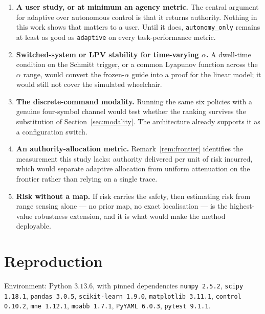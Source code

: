\documentclass[11pt,a4paper]{article}
\newcommand{\vauto}{\texttt{autonomy\_only}}
\newcommand{\vadapt}{\texttt{adaptive}}
\theoremstyle{plain}
\theoremstyle{definition}
\begin{document}
\begin{enumerate}
\item \textbf{A user study, or at minimum an agency metric.} The central
argument for adaptive over autonomous control is that it returns
authority. Nothing in this work shows that matters to a user. Until it
does, \vauto{} remains at least as good as \vadapt{} on every
task-performance metric.

\item \textbf{Switched-system or LPV stability for time-varying
$\alpha$.} A dwell-time condition on the Schmitt trigger, or a common
Lyapunov function across the $\alpha$ range, would convert the
frozen-$\alpha$ guide into a proof for the linear model; it would still
not cover the simulated wheelchair.

\item \textbf{The discrete-command modality.} Running the same six
policies with a genuine four-symbol channel would test whether the
ranking survives the substitution of Section~\ref{sec:modality}. The
architecture already supports it as a configuration switch.

\item \textbf{An authority-allocation metric.} Remark~\ref{rem:frontier}
identifies the measurement this study lacks: authority delivered per unit
of risk incurred, which would separate adaptive allocation from uniform
attenuation on the frontier rather than relying on a single trace.

\item \textbf{Risk without a map.} If risk carries
the safety, then estimating risk from range sensing alone --- no prior map,
no exact localisation --- is the highest-value robustness extension, and
it is what would make the method deployable.
\end{enumerate}

\appendix

\section{Reproduction}
\label{sec:repro}

Environment: Python $3.13.6$, with pinned dependencies
\texttt{numpy 2.5.2}, \texttt{scipy 1.18.1}, \texttt{pandas 3.0.5},
\texttt{scikit-learn 1.9.0}, \texttt{matplotlib 3.11.1},
\texttt{control 0.10.2}, \texttt{mne 1.12.1}, \texttt{moabb 1.7.1},
\texttt{PyYAML 6.0.3}, \texttt{pytest 9.1.1}.
\end{document}

